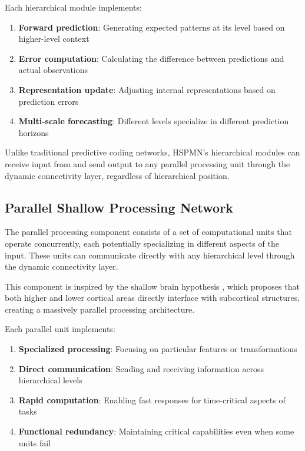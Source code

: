 \documentclass[11pt,a4paper,twocolumn]{article}
\begin{document}
Each hierarchical module implements:

\begin{enumerate}
    \item \textbf{Forward prediction}: Generating expected patterns at its level based on higher-level context
    \item \textbf{Error computation}: Calculating the difference between predictions and actual observations
    \item \textbf{Representation update}: Adjusting internal representations based on prediction errors
    \item \textbf{Multi-scale forecasting}: Different levels specialize in different prediction horizons
\end{enumerate}

Unlike traditional predictive coding networks, HSPMN's hierarchical modules can receive input from and send output to any parallel processing unit through the dynamic connectivity layer, regardless of hierarchical position.

\subsection{Parallel Shallow Processing Network}

The parallel processing component consists of a set of computational units that operate concurrently, each potentially specializing in different aspects of the input. These units can communicate directly with any hierarchical level through the dynamic connectivity layer.

This component is inspired by the shallow brain hypothesis \cite{suzuki2023shallow}, which proposes that both higher and lower cortical areas directly interface with subcortical structures, creating a massively parallel processing architecture.

Each parallel unit implements:

\begin{enumerate}
    \item \textbf{Specialized processing}: Focusing on particular features or transformations
    \item \textbf{Direct communication}: Sending and receiving information across hierarchical levels
    \item \textbf{Rapid computation}: Enabling fast responses for time-critical aspects of tasks
    \item \textbf{Functional redundancy}: Maintaining critical capabilities even when some units fail
\end{enumerate}
\end{document}
